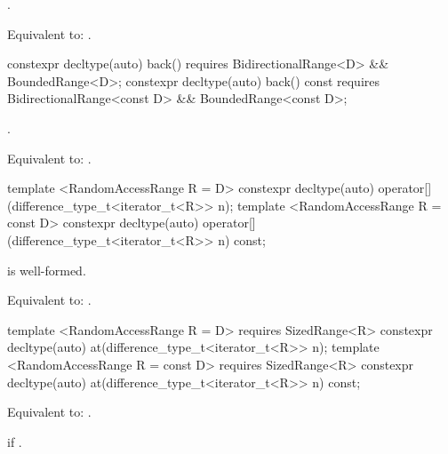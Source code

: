 \begin{itemdescr}
\pnum
\requires {}.

\pnum
\effects Equivalent to: .
\end{itemdescr}

%
\begin{itemdecl}
constexpr decltype(auto) back()
requires BidirectionalRange<D> && BoundedRange<D>;
constexpr decltype(auto) back() const
requires BidirectionalRange<const D> && BoundedRange<const D>;
\end{itemdecl}

\begin{itemdescr}
\pnum
\requires {}.

\pnum
\effects Equivalent to: .
\end{itemdescr}

%
\begin{itemdecl}
template <RandomAccessRange R = D>
constexpr decltype(auto) operator[](difference_type_t<iterator_t<R>> n);
template <RandomAccessRange R = const D>
constexpr decltype(auto) operator[](difference_type_t<iterator_t<R>> n) const;
\end{itemdecl}

\begin{itemdescr}
\pnum
\requires {} is well-formed.

\pnum
\effects Equivalent to: .
\end{itemdescr}

%
\begin{itemdecl}
template <RandomAccessRange R = D>
  requires SizedRange<R>
constexpr decltype(auto) at(difference_type_t<iterator_t<R>> n);
template <RandomAccessRange R = const D>
  requires SizedRange<R>
constexpr decltype(auto) at(difference_type_t<iterator_t<R>> n) const;
\end{itemdecl}

\begin{itemdescr}
\pnum
\effects Equivalent to: .

\pnum
\throws {} if .
\end{itemdescr}

